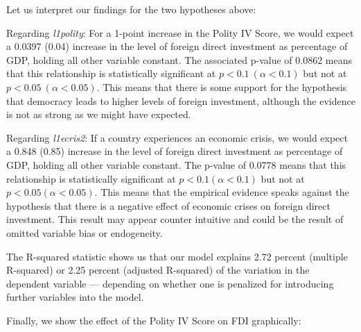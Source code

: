 \documentclass[12pt,letter]{article}\usepackage[]{graphicx}\usepackage[]{color}
\begin{document}
Let us interpret our findings for the two hypotheses above:

Regarding \textit{l1polity}: For a 1-point increase in the Polity IV Score, we would expect a 0.0397 (0.04) increase in the level of foreign direct investment as percentage of GDP, holding all other variable constant. The associated p-value of 0.0862 means that this relationship is statistically significant at $p < 0.1 \ (\alpha < 0.1)$ but not at $p < 0.05 \ (\alpha < 0.05)$. This means that there is some support for the hypothesis that democracy leads to higher levels of foreign investment, although the evidence is not as strong as we might have expected.

Regarding \textit{l1ecris2}: If a country experiences an economic crisis, we would expect a 0.848 (0.85) increase in the level of foreign direct investment as percentage of GDP, holding all other variable constant. The p-value of 0.0778 means that this relationship is statistically significant at $p < 0.1 (\alpha < 0.1)$ but not at $p < 0.05 (\alpha < 0.05)$. This means that the empirical evidence speaks against the hypothesis that there is a negative effect of economic crises on foreign direct investment. This result may appear counter intuitive and could be the result of omitted variable bias or endogeneity.

The R-squared statistic shows us that our model explains 2.72 percent (multiple R-squared) or 2.25 percent (adjusted R-squared) of the variation in the dependent variable --- depending on whether one is penalized for introducing further variables into the model.

Finally, we show the effect of the Polity IV Score on FDI graphically:
\end{document}
